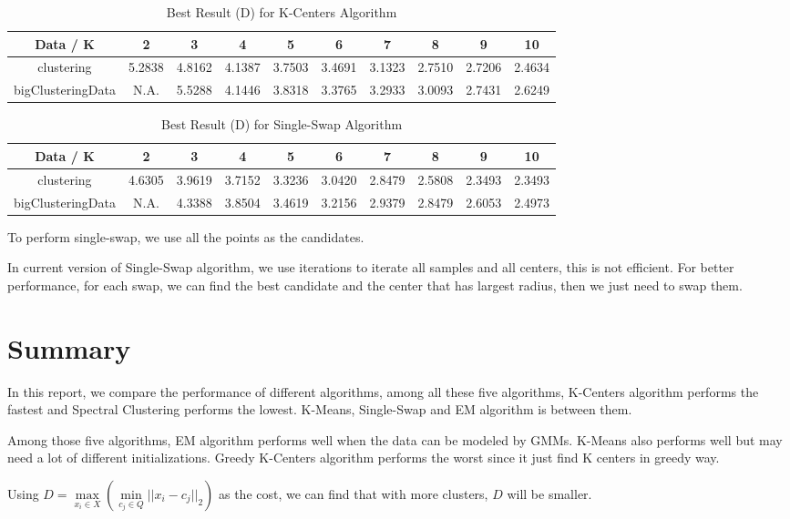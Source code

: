 \begin{table}[H]
	\centering
	\caption{Best Result (D) for K-Centers Algorithm}
	\label{table:best_kcenter2}	
	\begin{tabular}{ c | c | c | c | c | c | c | c | c | c}
		\hline \hline
		Data / K      & 2     &    3    & 4    & 5     & 6    & 7    & 8   & 9    & 10 \\[0.1cm]
		\hline
	clustering	        & 5.2838 &    4.8162 & 4.1387 & 3.7503 & 3.4691 & 3.1323 & 2.7510 & 2.7206 & 2.4634 \\[0.1cm]
bigClusteringData & N.A. &    5.5288 & 4.1446 & 3.8318 & 3.3765 & 3.2933 & 3.0093 & 2.7431 & 2.6249 \\[0.1cm]
		\hline	
	\end{tabular}
\end{table}

\begin{table}[H]
	\centering
	\caption{Best Result (D) for Single-Swap Algorithm}
	\label{table:best_single2}	
	\begin{tabular}{ c | c | c | c | c | c | c | c | c | c}
		\hline \hline
		Data / K      & 2     &    3    & 4    & 5     & 6    & 7    & 8   & 9    & 10 \\[0.1cm]
		\hline
	clustering	        & 4.6305 &    3.9619 & 3.7152 & 3.3236 & 3.0420 & 2.8479 & 2.5808 & 2.3493 & 2.3493 \\[0.1cm]
bigClusteringData & N.A. &    4.3388 & 3.8504 & 3.4619 & 3.2156 & 2.9379 & 2.8479 & 2.6053 & 2.4973 \\[0.1cm]
		\hline	
	\end{tabular}
\end{table}

To perform single-swap, we use all the points as the candidates.

In current version of Single-Swap algorithm, we use iterations to iterate all samples and all centers, this is not efficient. For better performance, for each swap, we can find the best candidate and the center that has largest radius, then we just need to swap them.

\section{\Large Summary}

In this report, we compare the performance of different algorithms, among all these five algorithms, K-Centers algorithm performs the fastest and Spectral Clustering performs the lowest. K-Means, Single-Swap and EM algorithm is between them. 

Among those five algorithms, EM algorithm performs well when the data can be modeled by GMMs. K-Means also performs well but may need a lot of different initializations. Greedy K-Centers algorithm performs the worst since it just find K centers in greedy way.

Using $D = \underset{x_i \in X}{\max}( \underset{c_j \in Q}{\min}{||x_i - c_j||_2})$ as the cost, we can find that with more clusters, $D$ will be smaller.

\clearpage



